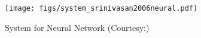 \begin{figure}[h]
\centering
\texttt{[image: figs/system\_srinivasan2006neural.pdf]}
\caption{System for Neural Network (Courtesy:\cite{srinivasan2006neural})}
\label{fig_system_srinivasan2006neural}
\end{figure}
